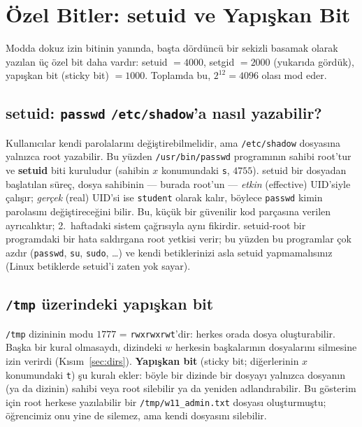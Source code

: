 \documentclass[11pt,a4paper]{article}
\newcommand{\term}[1]{\textbf{\color{mintdeep}#1}}
\newcommand{\cmd}[1]{\texttt{#1}}
\begin{document}
\section{Özel Bitler: setuid ve Yapışkan Bit}
\label{sec:special}

Modda dokuz izin bitinin yanında, başta dördüncü bir sekizli basamak olarak yazılan üç özel bit daha vardır: setuid $= 4000$, setgid $= 2000$ (yukarıda gördük), yapışkan bit (sticky bit) $= 1000$. Toplamda bu, $2^{12} = 4096$ olası mod eder.

\subsection{setuid: \cmd{passwd} \texttt{/etc/shadow}'a nasıl yazabilir?}



Kullanıcılar kendi parolalarını değiştirebilmelidir, ama \texttt{/etc/shadow} dosyasına yalnızca root yazabilir. Bu yüzden \texttt{/usr/bin/passwd} programının sahibi root'tur ve \term{setuid} biti kuruludur (sahibin $x$ konumundaki \texttt{s}, $4755$). setuid bir dosyadan başlatılan süreç, dosya sahibinin --- burada root'un --- \emph{etkin} (effective) UID'siyle çalışır; \emph{gerçek} (real) UID'si ise \texttt{student} olarak kalır, böylece \cmd{passwd} kimin parolasını değiştireceğini bilir. Bu, küçük bir güvenilir kod parçasına verilen ayrıcalıktır; 2.~haftadaki sistem çağrısıyla aynı fikirdir. setuid-root bir programdaki bir hata saldırgana root yetkisi verir; bu yüzden bu programlar çok azdır (\cmd{passwd}, \cmd{su}, \cmd{sudo}, \dots) ve kendi betiklerinizi asla setuid yapmamalısınız (Linux betiklerde setuid'i zaten yok sayar).

\subsection{\texttt{/tmp} üzerindeki yapışkan bit}



\texttt{/tmp} dizininin modu $1777$ = \texttt{rwxrwxrwt}'dir: herkes orada dosya oluşturabilir. Başka bir kural olmasaydı, dizindeki $w$ herkesin başkalarının dosyalarını silmesine izin verirdi (Kısım~\ref{sec:dirs}). \term{Yapışkan bit} (sticky bit; diğerlerinin $x$ konumundaki \texttt{t}) şu kuralı ekler: böyle bir dizinde bir dosyayı yalnızca dosyanın (ya da dizinin) sahibi veya root silebilir ya da yeniden adlandırabilir. Bu gösterim için root herkese yazılabilir bir \texttt{/tmp/w11\_admin.txt} dosyası oluşturmuştu; öğrencimiz onu yine de silemez, ama kendi dosyasını silebilir.
\end{document}

